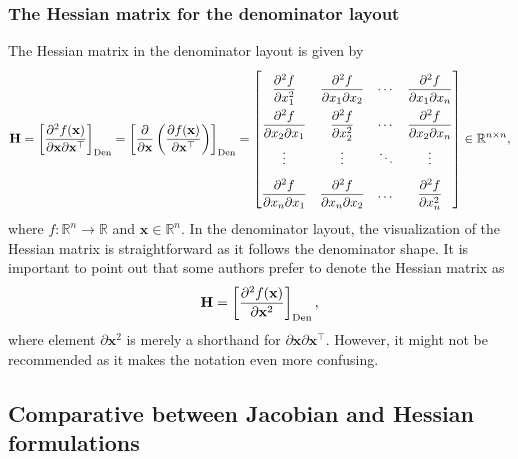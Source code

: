 \documentclass{article}
\begin{document}
\subsubsection{The Hessian matrix for the denominator layout}
The Hessian matrix in the denominator layout is given by
\begin{align}
    \label{eq:hessian-eq-denomintor}
    \mathbf{H} = \left[ \dfrac{\partial^{2} f(\mathbf{x})}{\partial\mathbf{x}\partial\mathbf{x}^\top} \right]_{\textnormal{Den}} = \left[ \dfrac{\partial}{\partial \mathbf{x}} \left(\dfrac{\partial f(\mathbf{x})}{\partial \mathbf{x}^\top}\right) \right]_{\textnormal{Den}} = \renewcommand{\arraystretch}{2.2}\begin{bmatrix}
        \dfrac{\partial^{2} f}{\partial x_1^2} & \dfrac{\partial^{2} f}{\partial x_1 \partial x_2} & \cdots & \dfrac{\partial^{2} f}{\partial x_1 \partial x_n} \\
        \dfrac{\partial^{2} f}{\partial x_2 \partial x_1} & \dfrac{\partial^{2} f}{\partial x_2^2} & \cdots & \dfrac{\partial^{2} f}{\partial x_2 \partial x_n} \\
        \vdots & \vdots & \ddots & \vdots \\
        \dfrac{\partial^{2} f}{\partial x_n \partial x_1} & \dfrac{\partial^{2} f}{\partial x_n \partial x_2} & \dots & \dfrac{\partial^{2} f}{\partial x_n^2}
    \end{bmatrix} \in \mathbb{R}^{n \times n},
\end{align}
where \(f: \mathbb{R}^{n} \rightarrow \mathbb{R}\) and \(\mathbf{x} \in \mathbb{R}^{n}\). In the denominator layout, the visualization of the Hessian matrix is straightforward as it follows the denominator shape. It is important to point out that some authors \cite{diniz1997adaptive,haykinAdaptiveFilterTheory2002} prefer to denote the Hessian matrix as
\begin{align}
    \mathbf{H} = \left[ \dfrac{\partial^{2} f(\mathbf{x})}{\partial \mathbf{x}^2} \right]_{\textnormal{Den}},
\end{align}
where element \(\partial\mathbf{x}^2\) is merely a shorthand for \(\partial\mathbf{x}\partial\mathbf{x}^\top\). However, it might not be recommended as it makes the notation even more confusing.

\subsection{Comparative between Jacobian and Hessian formulations}
\end{document}
